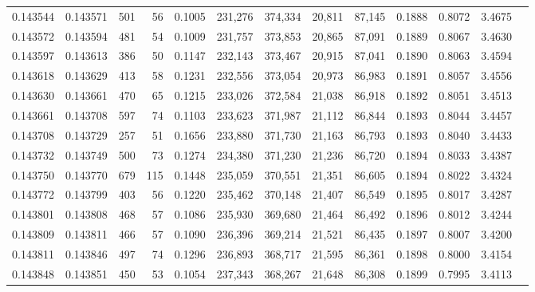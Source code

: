 \begin{tabular}{rrrrrrrrrrrrr}
0.143544 & 0.143571 &   501 &  56 &                                     0.1005 & 231,276 & 374,334 &  20,811 &  87,145 & 0.1888 & 0.8072 & 3.4675 \\
0.143572 & 0.143594 &   481 &  54 &                                     0.1009 & 231,757 & 373,853 &  20,865 &  87,091 & 0.1889 & 0.8067 & 3.4630 \\
0.143597 & 0.143613 &   386 &  50 &                                     0.1147 & 232,143 & 373,467 &  20,915 &  87,041 & 0.1890 & 0.8063 & 3.4594 \\
0.143618 & 0.143629 &   413 &  58 &                                     0.1231 & 232,556 & 373,054 &  20,973 &  86,983 & 0.1891 & 0.8057 & 3.4556 \\
0.143630 & 0.143661 &   470 &  65 &                                     0.1215 & 233,026 & 372,584 &  21,038 &  86,918 & 0.1892 & 0.8051 & 3.4513 \\
0.143661 & 0.143708 &   597 &  74 &                                     0.1103 & 233,623 & 371,987 &  21,112 &  86,844 & 0.1893 & 0.8044 & 3.4457 \\
0.143708 & 0.143729 &   257 &  51 &                                     0.1656 & 233,880 & 371,730 &  21,163 &  86,793 & 0.1893 & 0.8040 & 3.4433 \\
0.143732 & 0.143749 &   500 &  73 &                                     0.1274 & 234,380 & 371,230 &  21,236 &  86,720 & 0.1894 & 0.8033 & 3.4387 \\
0.143750 & 0.143770 &   679 & 115 &                                     0.1448 & 235,059 & 370,551 &  21,351 &  86,605 & 0.1894 & 0.8022 & 3.4324 \\
0.143772 & 0.143799 &   403 &  56 &                                     0.1220 & 235,462 & 370,148 &  21,407 &  86,549 & 0.1895 & 0.8017 & 3.4287 \\
0.143801 & 0.143808 &   468 &  57 &                                     0.1086 & 235,930 & 369,680 &  21,464 &  86,492 & 0.1896 & 0.8012 & 3.4244 \\
0.143809 & 0.143811 &   466 &  57 &                                     0.1090 & 236,396 & 369,214 &  21,521 &  86,435 & 0.1897 & 0.8007 & 3.4200 \\
0.143811 & 0.143846 &   497 &  74 &                                     0.1296 & 236,893 & 368,717 &  21,595 &  86,361 & 0.1898 & 0.8000 & 3.4154 \\
0.143848 & 0.143851 &   450 &  53 &                                     0.1054 & 237,343 & 368,267 &  21,648 &  86,308 & 0.1899 & 0.7995 & 3.4113 \\

\end{tabular}
